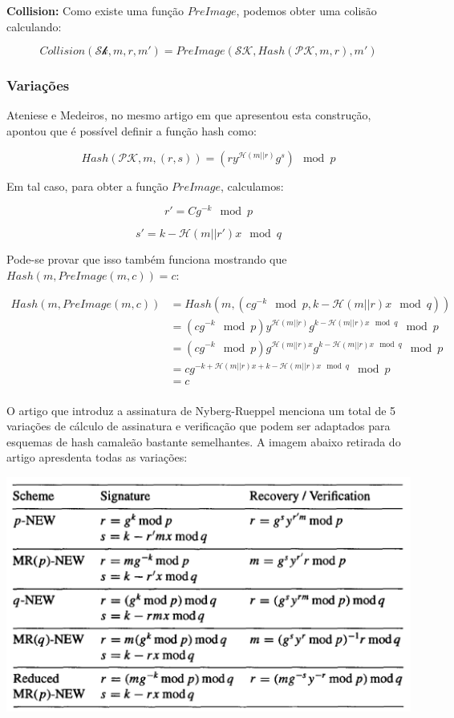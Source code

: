 \documentclass[a4paper]{article}
\begin{document}
    
    
    \textbf{Collision:} Como existe uma função $PreImage$, podemos
    obter uma colisão calculando:
    
    $$ Collision(\mathcal{Sk}, m, r, m') = PreImage(\mathcal{SK},
    Hash(\mathcal{PK}, m, r), m')
    $$
    
    \subsubsection{Variações}
    
    Ateniese e Medeiros, no mesmo artigo em que apresentou esta construção,
    apontou que é possível definir a função hash como:
    
    $$ Hash(\mathcal{PK}, m, (r, s)) =
    \left(ry^{\mathcal{H}(m||r)}g^{s} \right)\mod p
    $$
    
    Em tal caso, para obter a função $PreImage$, calculamos:
    
    $$
    r'=Cg^{-k} \mod p
    $$
    
    $$
    s' = k-\mathcal{H}(m||r')x \mod q
    $$
    
    Pode-se provar que isso também funciona mostrando que $Hash(m,
    PreImage(m, c))=c$:
    
    \begin{equation}
    \begin{split}
      Hash(m, PreImage(m, c))
      &= Hash(m, (cg^{-k} \mod p, k-\mathcal{H}(m||r)x \mod q))\\
      &= (cg^{-k} \mod p)y^{\mathcal{H}(m||r)}g^{k-\mathcal{H}(m||r)x\mod q}\mod p\\
      &= (cg^{-k} \mod p)g^{\mathcal{H}(m||r)x}g^{k-\mathcal{H}(m||r)x\mod q}\mod p\\
      &= cg^{-k+\mathcal{H}(m||r)x+k-\mathcal{H}(m||r)x \mod q} \mod p\\
      &= c\\
    \end{split}
    \end{equation}
    
    O artigo que introduz a assinatura de Nyberg-Rueppel \cite{nyberg}
    menciona um total de 5 variações de cálculo de assinatura e
    verificação que podem ser adaptados para esquemas de hash camaleão
    bastante semelhantes. A imagem abaixo retirada do artigo apresdenta
    todas as variações:
    
    \includegraphics[width=\textwidth]{imagens/nyberg.png}
    
\end{document}
